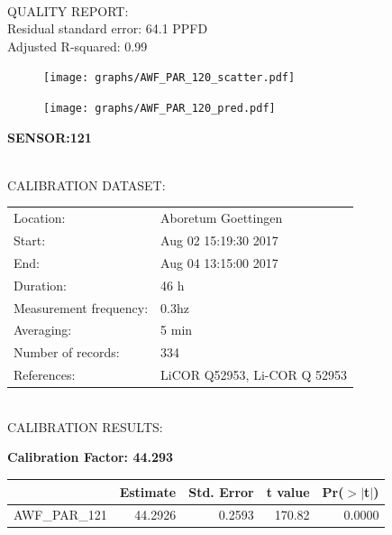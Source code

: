 \documentclass[oneside]{report}
\begin{document}
\hrulefill\\
QUALITY REPORT:\\
Residual standard error: 64.1 PPFD\\
Adjusted R-squared: 0.99



\begin{figure}[H]
  \centering
  \texttt{[image: graphs/AWF\_PAR\_120\_scatter.pdf]}
\end{figure}




\begin{figure}[H]
  \centering
  \texttt{[image: graphs/AWF\_PAR\_120\_pred.pdf]}
\end{figure}

\pagebreak


\begin{center}
\large{\textbf{SENSOR:121}}\\
\end{center}

\hrulefill\\
CALIBRATION DATASET:\\
\begin{table}[h!]
  \centering
  \label{tab:table1}
  \begin{tabular}{ll}
    Location: & Aboretum Goettingen\\ 
    
    
    Start:  & Aug 02 15:19:30 2017 \\
    End:   & Aug 04 13:15:00 2017\\ 
    Duration: & 46 h\\
    Measurement frequency: & 0.3hz\\
    Averaging:  &5 min\\
    Number of records: & 334 \\
    References: & LiCOR Q52953, Li-COR Q 52953 \\
  \end{tabular}
\end{table}

\hrulefill\\
CALIBRATION RESULTS:\\


\begin{center}
\textbf{\large{Calibration Factor: 44.293}}\\
\end{center}
\begin{table}[ht]
\centering
\begin{tabular}{rrrrr}
  \hline
 & Estimate & Std. Error & t value & Pr($>$$|$t$|$) \\ 
  \hline
AWF\_PAR\_121 & 44.2926 & 0.2593 & 170.82 & 0.0000 \\ 
   \hline
\end{tabular}
\end{table}
\end{document}

